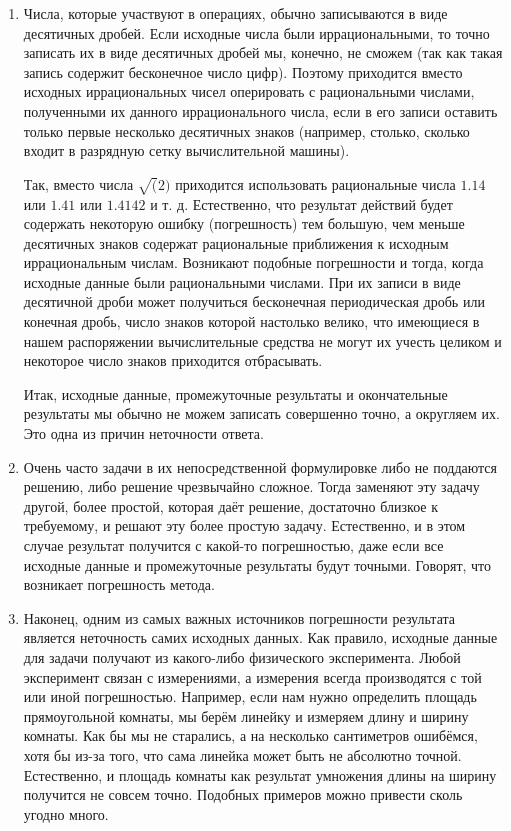 \begin{enumerate}
	\item Числа, которые участвуют в операциях, обычно записываются в виде
		десятичных дробей. Если исходные числа были иррациональными, то
		точно записать их в виде десятичных дробей мы, конечно, не
		сможем (так как такая запись содержит бесконечное число цифр).
		Поэтому приходится вместо исходных иррациональных чисел
		оперировать с рациональными числами, полученными их данного
		иррационального числа, если в его записи оставить только первые
		несколько десятичных знаков (например, столько, сколько входит
		в разрядную сетку вычислительной машины).

		Так, вместо числа $\sqrt(2)$ приходится использовать
		рациональные числа $1.14$ или $1.41$ или $1.4142$ и т. д.
		Естественно, что результат действий будет содержать некоторую
		ошибку (погрешность) тем большую, чем меньше десятичных знаков
		содержат рациональные приближения к исходным иррациональным
		числам. Возникают подобные погрешности и тогда, когда исходные
		данные были рациональными числами. При их записи в виде
		десятичной дроби может получиться бесконечная периодическая
		дробь или конечная дробь, число знаков которой настолько
		велико, что имеющиеся в нашем распоряжении вычислительные
		средства не могут их учесть целиком и некоторое число знаков
		приходится отбрасывать.

		Итак, исходные данные, промежуточные результаты и окончательные
		результаты мы обычно не можем записать совершенно точно, а
		округляем их. Это одна из причин неточности ответа.

	\item Очень часто задачи в их непосредственной формулировке либо не
		поддаются решению, либо решение чрезвычайно сложное. Тогда
		заменяют эту задачу другой, более простой, которая даёт
		решение, достаточно близкое к требуемому, и решают эту более
		простую задачу. Естественно, и в этом случае результат
		получится с какой-то погрешностью, даже если все исходные
		данные и промежуточные результаты будут точными. Говорят, что
		возникает погрешность метода.

	\item Наконец, одним из самых важных источников погрешности результата
		является неточность самих исходных данных. Как правило,
		исходные данные для задачи получают из какого-либо физического
		эксперимента. Любой эксперимент связан с измерениями, а
		измерения всегда производятся с той или иной погрешностью.
		Например, если нам нужно определить площадь прямоугольной
		комнаты, мы берём линейку и измеряем длину и ширину комнаты.
		Как бы мы не старались, а на несколько сантиметров ошибёмся,
		хотя бы из-за того, что сама линейка может быть не абсолютно
		точной. Естественно, и площадь комнаты как результат умножения
		длины на ширину получится не совсем точно. Подобных примеров
		можно привести сколь угодно много.
\end{enumerate}

